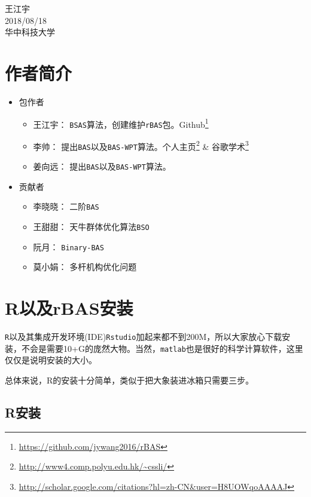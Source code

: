 \documentclass[]{ctexbook}
\providecommand{\tightlist}{%
  \setlength{\itemsep}{0pt}\setlength{\parskip}{0pt}}
\renewcommand{\href}[2]{#2\footnote{\url{#1}}}
\let\BeginKnitrBlock\begin \let\EndKnitrBlock\end
\begin{document}
\BeginKnitrBlock{flushright}
王江宇\\
2018/08/18\\
华中科技大学
\EndKnitrBlock{flushright}

\chapter*{作者简介}\label{author}


\begin{itemize}
\tightlist
\item
  包作者

  \begin{itemize}
  \tightlist
  \item
    王江宇：
    \texttt{BSAS}算法，创建维护\texttt{rBAS}包。\href{https://github.com/jywang2016/rBAS}{Github}
  \item
    李帅：
    提出\texttt{BAS}以及\texttt{BAS-WPT}算法。\href{http://www4.comp.polyu.edu.hk/~cssli/}{个人主页}
    \&
    \href{http://scholar.google.com/citations?hl=zh-CN\&user=H8UOWqoAAAAJ}{谷歌学术}
  \item
    姜向远： 提出\texttt{BAS}以及\texttt{BAS-WPT}算法。
  \end{itemize}
\item
  贡献者

  \begin{itemize}
  \tightlist
  \item
    李晓晓： 二阶\texttt{BAS}
  \item
    王甜甜： 天牛群体优化算法\texttt{BSO}
  \item
    阮月： \texttt{Binary-BAS}
  \item
    莫小娟： 多杆机构优化问题
  \end{itemize}
\end{itemize}

\chapter{R以及rBAS安装}\label{install}

\texttt{R}以及其集成开发环境(IDE)\texttt{Rstudio}加起来都不到200M，所以大家放心下载安装，不会是需要10+G的庞然大物。当然，\texttt{matlab}也是很好的科学计算软件，这里仅仅是说明安装的大小。

总体来说，R的安装十分简单，类似于把大象装进冰箱只需要三步。

\section{R安装}\label{Rinstall}
\end{document}
